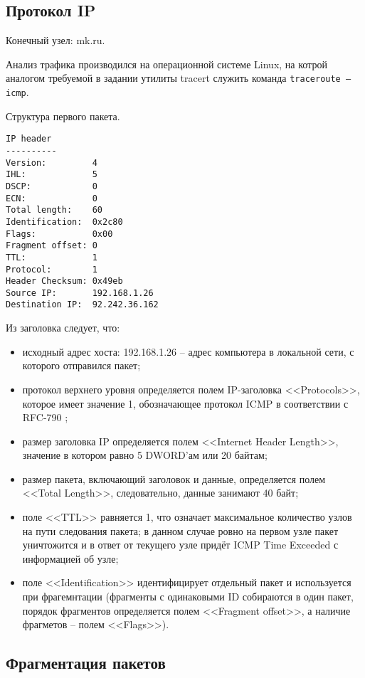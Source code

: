 \documentclass[12pt, a4paper] {ncc}
\begin{document}
    \subsection*{Протокол IP}
        Конечный узел: mk.ru.

        Анализ трафика производился на операционной системе Linux, на котрой
        аналогом требуемой в задании утилиты tracert служить команда
        \texttt{traceroute --icmp}.

        Структура первого пакета.
    \begin{verbatim}
IP header
----------
Version:         4
IHL:             5
DSCP:            0
ECN:             0
Total length:    60
Identification:  0x2c80
Flags:           0x00
Fragment offset: 0
TTL:             1
Protocol:        1
Header Checksum: 0x49eb
Source IP:       192.168.1.26
Destination IP:  92.242.36.162
    \end{verbatim}
    Из заголовка следует, что:
    \begin{itemize}
        \item исходный адрес хоста: 192.168.1.26 -- адрес компьютера в локальной сети, с которого
              отправился пакет;
        \item протокол верхнего уровня определяется полем IP-заголовка <<Protocols>>, которое имеет
              значение 1, обозначающее протокол ICMP в соответствии с RFC-790 ;
        \item размер заголовка IP определяется полем <<Internet Header Length>>, значение в котором
              равно 5 DWORD'ам или 20 байтам; 
        \item размер пакета, включающий заголовок и данные, определяется
              полем <<Total Length>>, следовательно, данные занимают 40 байт;
        \item поле <<TTL>> равняется 1, что означает максимальное количество узлов на пути следования
              пакета; в данном случае ровно на первом узле пакет уничтожится и в
              ответ от текущего узле придёт ICMP Time Exceeded с информацией об узле;
        \item поле <<Identification>> идентифицирует отдельный пакет и используется 
              при фрагемнтации (фрагменты с одинаковыми ID собираются в один пакет, 
              порядок фрагментов определяется полем <<Fragment offset>>, а
              наличие фрагметов -- полем <<Flags>>).
    \end{itemize}
    
    \subsection*{Фрагментация пакетов}
\end{document}
